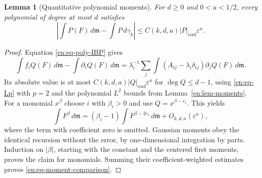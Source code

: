 \documentclass[12pt]{amsart}
\newtheorem{lem}[thm]{Lemma}
\theoremstyle{definition}
\theoremstyle{remark}
\numberwithin{equation}{section}
\newcommand{\m}{\mathfrak m}
\theoremstyle{jpplain}
\begin{document}
\begin{lem}[Quantitative polynomial moments]\label{en:lem-Gram}
For $d\geq0$ and $0<a<1/2$, every polynomial of degree at most $d$ satisfies
\begin{equation}\label{en:eq-moment-comparison}
 \left|\int P(F)\,d\m-\int P\,d\gamma_k\right|
 \leq C(k,d,a)|P|_{\mathrm{coef}}\varepsilon^a.
\end{equation}
\end{lem}
\begin{proof}
Equation \eqref{en:eq-poly-IBP} gives
\[
 \int f_iQ(F)\,d\m-\int\partial_iQ(F)\,d\m
 =\lambda_i^{-1}\sum_j\int
       (A_{ij}-\lambda_i\delta_{ij})\partial_jQ(F)\,d\m.
\]
Its absolute value is at most
$C(k,d,a)|Q|_{\mathrm{coef}}\varepsilon^a$ for $\deg Q\leq d-1$,
using \eqref{en:eq-Lp} with $p=2$ and the polynomial $L^2$ bounds from
Lemma~\ref{en:lem-moments}.  For a monomial $x^\beta$ choose $i$ with
$\beta_i>0$ and use $Q=x^{\beta-e_i}$.  This yields
\[
 \int F^\beta\,d\m
 =(\beta_i-1)\int F^{\beta-2e_i}\,d\m+O_{k,d,a}(\varepsilon^a),
\]
where the term with coefficient zero is omitted.  Gaussian moments obey
the identical recursion without the error, by one-dimensional integration
by parts.  Induction on $|\beta|$, starting with the constant and the
centered first moments, proves the claim for monomials.  Summing their
coefficient-weighted estimates proves \eqref{en:eq-moment-comparison}.
\end{proof}
\end{document}
